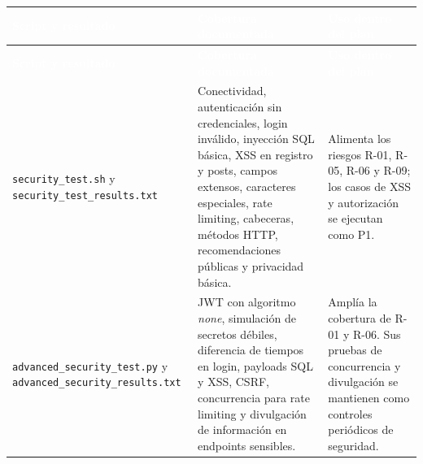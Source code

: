 \documentclass[11pt,a4paper]{article}
\newcommand{\thead}[1]{\textcolor{white}{\textbf{#1}}}
\begin{document}
\begin{longtable}{p{5.0cm}p{5.0cm}p{5.0cm}}
\rowcolor{uniwayblue}\thead{Script y resultado} & \thead{Cobertura documentada} & \thead{Uso dentro del plan}\\
\endfirsthead
\rowcolor{uniwayblue}\thead{Script y resultado} & \thead{Cobertura documentada} & \thead{Uso dentro del plan}\\
\endhead
\texttt{security\_test.sh} y \texttt{security\_test\_results.txt} & Conectividad, autenticación sin credenciales, login inválido, inyección SQL básica, XSS en registro y posts, campos extensos, caracteres especiales, rate limiting, cabeceras, métodos HTTP, recomendaciones públicas y privacidad básica. & Alimenta los riesgos R-01, R-05, R-06 y R-09; los casos de XSS y autorización se ejecutan como P1.\\
\rowcolor{lightgray}\texttt{advanced\_security\_test.py} y \texttt{advanced\_security\_results.txt} & JWT con algoritmo \emph{none}, simulación de secretos débiles, diferencia de tiempos en login, payloads SQL y XSS, CSRF, concurrencia para rate limiting y divulgación de información en endpoints sensibles. & Amplía la cobertura de R-01 y R-06. Sus pruebas de concurrencia y divulgación se mantienen como controles periódicos de seguridad.\\
\end{longtable}
\end{document}
